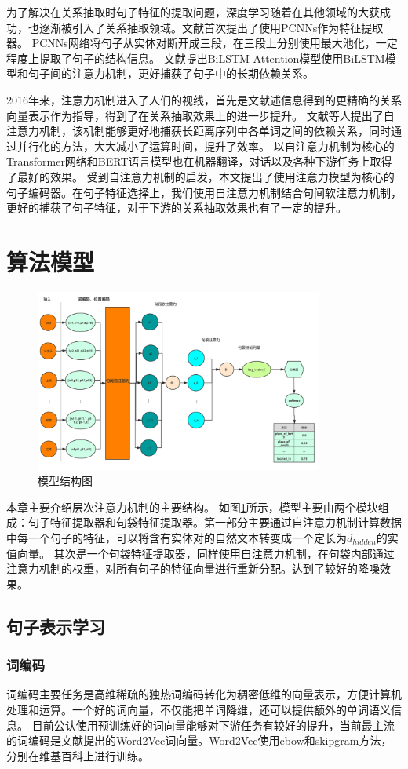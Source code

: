 \documentclass[UTF8]{csoarticle}
\begin{document}
为了解决在关系抽取时句子特征的提取问题，深度学习随着在其他领域的大获成功，也逐渐被引入了关系抽取领域。文献\cite{bib3}首次提出了使用PCNNs作为特征提取器。
PCNNs网络将句子从实体对断开成三段，在三段上分别使用最大池化，一定程度上提取了句子的结构信息。
文献\cite{bib4}提出BiLSTM-Attention模型使用BiLSTM模型和句子间的注意力机制，更好捕获了句子中的长期依赖关系。

2016年来，注意力机制进入了人们的视线，首先是文献\cite{bib5}述信息得到的更精确的关系向量表示作为指导，得到了在关系抽取效果上的进一步提升。
文献\cite{bib6}等人提出了自注意力机制，该机制能够更好地捕获长距离序列中各单词之间的依赖关系，同时通过并行化的方法，大大减小了运算时间，提升了效率。
以自注意力机制为核心的Transformer网络和BERT语言模型也在机器翻译，对话以及各种下游任务上取得了最好的效果。
受到自注意力机制的启发，本文提出了使用注意力模型为核心的句子编码器。在句子特征选择上，我们使用自注意力机制结合句间软注意力机制，更好的捕获了句子特征，对于下游的关系抽取效果也有了一定的提升。
\section{算法模型}
\begin{figure}
    \centering\includegraphics[height=6cm]{structure.png}
    \caption{模型结构图}
    \label{fig:structure}
    \end{figure}

本章主要介绍层次注意力机制的主要结构。
如图\ref{fig:structure}所示，模型主要由两个模块组成：句子特征提取器和句袋特征提取器。第一部分主要通过自注意力机制计算数据中每一个句子的特征，可以将含有实体对的自然文本转变成一个定长为$d_{hidden}$的实值向量。
其次是一个句袋特征提取器，同样使用自注意力机制，在句袋内部通过注意力机制的权重，对所有句子的特征向量进行重新分配。达到了较好的降噪效果。
\subsection{句子表示学习}
\subsubsection{词编码}
词编码主要任务是高维稀疏的独热词编码转化为稠密低维的向量表示，方便计算机处理和运算。一个好的词向量，不仅能把单词降维，还可以提供额外的单词语义信息。
目前公认使用预训练好的词向量能够对下游任务有较好的提升，当前最主流的词编码是文献\cite{bib7}提出的Word2Vec词向量。Word2Vec使用cbow和skipgram方法，分别在维基百科上进行训练。
\end{document}
